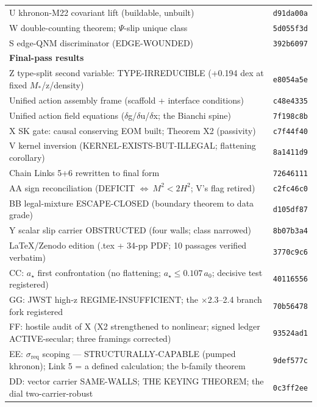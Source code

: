 \documentclass[11pt,a4paper]{article}
\begin{document}
\begin{longtable}{@{}p{11.5cm} l@{}}
\addlinespace
U khronon-M22 covariant lift (buildable, unbuilt) & \texttt{d91da00a} \\
\addlinespace
W double-counting theorem; $\Psi$-slip unique class & \texttt{5d055f3d} \\
\addlinespace
S edge-QNM discriminator (EDGE-WOUNDED) & \texttt{392b6097} \\
\addlinespace
\textbf{Final-pass results} &  \\
\addlinespace
Z type-split second variable: TYPE-IRREDUCIBLE (+0.194 dex at fixed $M_\ast$/z/density) & \texttt{e8054a5e} \\
\addlinespace
Unified action assembly frame (scaffold + interface conditions) & \texttt{c48e4335} \\
\addlinespace
Unified action field equations ($\delta$g/$\delta$u/$\delta$x; the Bianchi spine) & \texttt{7f198c8b} \\
\addlinespace
X SK gate: causal conserving EOM built; Theorem X2 (passivity) & \texttt{c7f44f40} \\
\addlinespace
V kernel inversion (KERNEL-EXISTS-BUT-ILLEGAL; flattening corollary) & \texttt{8a1411d9} \\
\addlinespace
Chain Links 5+6 rewritten to final form & \texttt{72646111} \\
\addlinespace
AA sign reconciliation (DEFICIT $\Longleftrightarrow\ M^2 < 2H^2$; V's flag retired) & \texttt{c2fc46c0} \\
\addlinespace
BB legal-mixture ESCAPE-CLOSED (boundary theorem to data grade) & \texttt{d105df87} \\
\addlinespace
Y scalar slip carrier OBSTRUCTED (four walls; class narrowed) & \texttt{8b07b3a4} \\
LaTeX/Zenodo edition (.tex + 34-pp PDF; 10 passages verified verbatim) & \texttt{3770c9c6} \\
CC: $a_\star$ first confrontation (no flattening; $a_\star \le 0.107\,a_0$; decisive test registered) & \texttt{40116556} \\
GG: JWST high-z REGIME-INSUFFICIENT; the $\times$2.3--2.4 branch fork registered & \texttt{70b56478} \\
FF: hostile audit of X (X2 strengthened to nonlinear; signed ledger ACTIVE-secular; three framings corrected) & \texttt{93524ad1} \\
EE: $\sigma_{\mathrm{req}}$ scoping --- STRUCTURALLY-CAPABLE (pumped khronon); Link 5 = a defined calculation; the b-family theorem & \texttt{9def577c} \\
DD: vector carrier SAME-WALLS; THE KEYING THEOREM; the dial two-carrier-robust & \texttt{0c3ff2ee} \\

\end{longtable}
\end{document}
